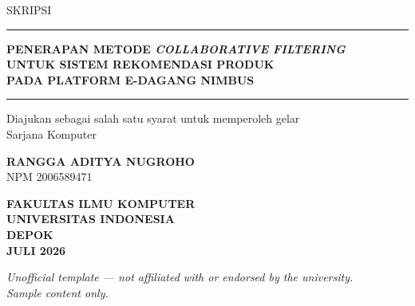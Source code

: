\documentclass[12pt,a4paper]{report}
\begin{document}
\begin{titlepage}
\thispagestyle{empty}
\begin{center}

\vspace*{0.4cm}
{\small\color{uigray} SKRIPSI}

\vspace{1.6cm}
{\color{uigold}\rule{5.5cm}{1.4pt}}

\vspace{1.2cm}
{\Large\bfseries\color{uinavy}
PENERAPAN METODE \emph{COLLABORATIVE FILTERING}\\[4pt]
UNTUK SISTEM REKOMENDASI PRODUK\\[4pt]
PADA PLATFORM E-DAGANG NIMBUS
\par}

\vspace{1.2cm}
{\color{uigold}\rule{5.5cm}{1.4pt}}

\vspace{2cm}
{\normalsize
Diajukan sebagai salah satu syarat untuk memperoleh gelar\\
Sarjana Komputer
\par}

\vspace{2cm}
{\normalsize\bfseries RANGGA ADITYA NUGROHO}\\[2pt]
{\normalsize NPM 2006589471}

\vfill


\vfill

{\normalsize\bfseries FAKULTAS ILMU KOMPUTER}\\
{\normalsize\bfseries UNIVERSITAS INDONESIA}\\
{\normalsize\bfseries DEPOK}\\
{\normalsize\bfseries JULI 2026}

\vspace{0.8cm}
{\footnotesize\itshape\color{uigray}
Unofficial template --- not affiliated with or endorsed by the university.\\
Sample content only.
\par}

\end{center}
\end{titlepage}
\end{document}
